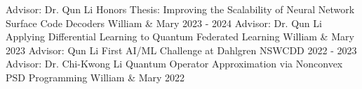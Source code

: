 
\begin{cventries}
\cventry
{Advisor: Dr. Qun Li}
{Honors Thesis: Improving the Scalability of Neural Network Surface Code Decoders}
{William \& Mary}
{2023 - 2024}{}
\cventry
{Advisor: Dr. Qun Li}
{Applying Differential Learning to Quantum Federated Learning}
{William \& Mary}
{2023}{}
\cventry
{Advisor: Qun Li}
{First AI/ML Challenge at Dahlgren}
{NSWCDD}
{2022 - 2023}{}
\cventry
{Advisor: Dr. Chi-Kwong Li}
{Quantum Operator Approximation via Nonconvex PSD Programming}
{William \& Mary}
{2022}{}

\end{cventries}
